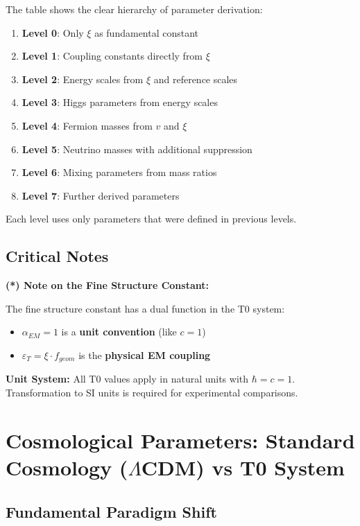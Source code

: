 \documentclass[12pt,a4paper]{article}
\begin{document}
The table shows the clear hierarchy of parameter derivation:

\begin{enumerate}
	\item \textbf{Level 0}: Only $\xi$ as fundamental constant
	\item \textbf{Level 1}: Coupling constants directly from $\xi$
	\item \textbf{Level 2}: Energy scales from $\xi$ and reference scales
	\item \textbf{Level 3}: Higgs parameters from energy scales
	\item \textbf{Level 4}: Fermion masses from $v$ and $\xi$
	\item \textbf{Level 5}: Neutrino masses with additional suppression
	\item \textbf{Level 6}: Mixing parameters from mass ratios
	\item \textbf{Level 7}: Further derived parameters
\end{enumerate}

Each level uses only parameters that were defined in previous levels.

\subsection{Critical Notes}
\label{subsec:critical_notes}

\textbf{(*) Note on the Fine Structure Constant:}

The fine structure constant has a dual function in the T0 system:
\begin{itemize}
	\item $\alpha_{EM} = 1$ is a \textbf{unit convention} (like $c = 1$)
	\item $\varepsilon_T = \xi \cdot f_{geom}$ is the \textbf{physical EM coupling}
\end{itemize}

\textbf{Unit System:}
All T0 values apply in natural units with $\hbar = c = 1$. Transformation to SI units is required for experimental comparisons.
\section{Cosmological Parameters: Standard Cosmology ($\Lambda$CDM) vs T0 System}
\label{sec:cosmic_t0_mapping}

\subsection{Fundamental Paradigm Shift}
\label{subsec:paradigm_shift}
\end{document}
